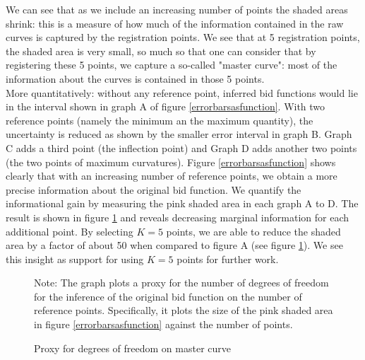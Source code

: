 We can see that as we include an increasing number of points the shaded areas shrink: this is a measure of how much of the information contained in the raw curves is captured by the registration points. We see that at 5 registration points, the shaded area is very small, so much so that one can consider that by registering these 5 points, we capture a so-called "master curve": most of the information about the curves is contained in those 5 points.\\

More quantitatively: without any reference point, inferred bid functions would lie in the interval shown in graph A of figure \ref{errorbarsasfunction}. With two reference points (namely the minimum an the maximum quantity), the uncertainty is reduced as shown by the smaller error interval in graph B. Graph C adds a third point (the inflection point) and Graph D adds another two points (the two points of maximum curvatures). Figure \ref{errorbarsasfunction} shows clearly that with an increasing number of reference points, we obtain a more precise information about the original bid function. We quantify the informational gain by measuring the pink shaded area in each graph A to D. The result is shown in figure \ref{decreasingdegreesoff} and reveals decreasing marginal information for each additional point. By selecting $K=5$ points, we are able to reduce the shaded area by a factor of about 50 when compared to figure A (see figure \ref{decreasingdegreesoff}). We see this insight as support for using $K=5$ points for further work. \\

\begin{figure}[!ht]
\begin{center}
\caption{Proxy for degrees of freedom on master curve}
\label{decreasingdegreesoff}
\end{center}
{ \small Note: The graph plots a proxy for the number of degrees of freedom for the inference of the original bid function on the number of reference points. Specifically, it plots the size of the pink shaded area in figure \ref{errorbarsasfunction} against the number of points. } 
\end{figure}

